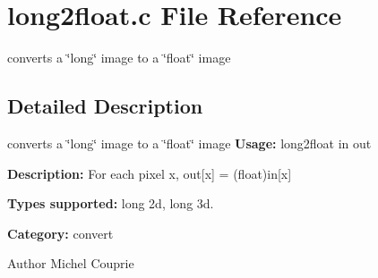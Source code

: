 \section{long2float.c File Reference}
\label{long2float_8c}


converts a \char`\"{}long\char`\"{} image to a \char`\"{}float\char`\"{} image  




\subsection{Detailed Description}
converts a \char`\"{}long\char`\"{} image to a \char`\"{}float\char`\"{} image {\bfseries Usage:} long2float in out

{\bfseries Description:} For each pixel x, out[x] = (float)in[x]

{\bfseries Types supported:} long 2d, long 3d.

{\bfseries Category:} convert

\begin{DoxyAuthor}{Author}
Michel Couprie 
\end{DoxyAuthor}
